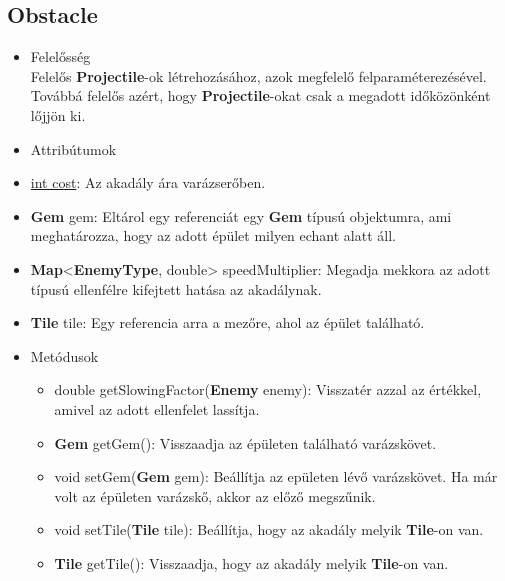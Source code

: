 \subsection{Obstacle}
\begin{itemize}
\item Felelősség\\
Felelős \textbf{Projectile}-ok létrehozásához, azok megfelelő felparaméterezésével. Továbbá felelős azért, hogy \textbf{Projectile}-okat csak a megadott időközönként lőjjön ki.
\item Attribútumok
		\item \underline{int cost}: Az akadály ára varázserőben.
		\item \textbf{Gem} gem: Eltárol egy referenciát egy \textbf{Gem} típusú objektumra, ami meghatározza, hogy az adott épület milyen echant alatt áll.
		\item \textbf{Map}<\textbf{EnemyType}, double> speedMultiplier: Megadja mekkora az adott típusú ellenfélre kifejtett hatása az akadálynak.
		\item \textbf{Tile} tile: Egy referencia arra a mezőre, ahol az épület található.
\item Metódusok
	\begin{itemize}
		\item double getSlowingFactor(\textbf{Enemy} enemy): Visszatér azzal az értékkel, amivel az adott ellenfelet lassítja.
		\item \textbf{Gem} getGem(): Visszaadja az épületen található varázskövet.
		\item void setGem(\textbf{Gem} gem): Beállítja az epületen lévő varázskövet. Ha már volt az épületen varázskő, akkor az előző megszűnik.
		\item void setTile(\textbf{Tile} tile): Beállítja, hogy az akadály melyik \textbf{Tile}-on van.
		\item \textbf{Tile} getTile(): Visszaadja, hogy az akadály melyik \textbf{Tile}-on van.
	\end{itemize}
\end{itemize}


